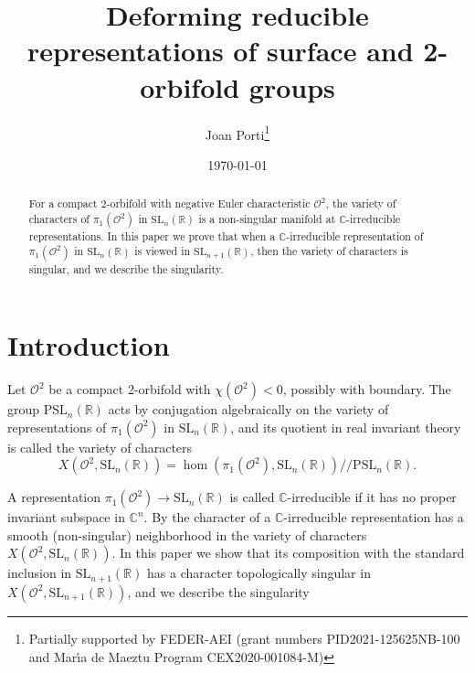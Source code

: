 \documentclass[a4paper,11pt]{article}
\begin{document}
\title{Deforming reducible representations of surface and 2-orbifold groups}

\author{Joan Porti\footnote{Partially supported by 
FEDER-AEI (grant numbers PID2021-125625NB-100 and
Mar\'\i a de Maeztu Program CEX2020-001084-M)
}} 

\date{\today}
\maketitle

\begin{abstract}
For a compact 2-orbifold with negative Euler characteristic $\mathcal O^2$, 
the variety of characters of $\pi_1(\mathcal O^2)$ in $\mathrm{SL}_{n}(\mathbb R)$
is a non-singular manifold at  $\mathbb C$-irreducible representations. In this paper we prove that when 
a $\mathbb C$-irreducible representation of $\pi_1(\mathcal O^2)$ in $\mathrm{SL}_{n}(\mathbb R)$ is viewed
in  $\mathrm{SL}_{n+1}(\mathbb R)$, then the variety of characters is singular, 
and we describe the singularity. 
\end{abstract}



 
\section{Introduction}
\label{Section:introduction}




Let $\mathcal O^2$ be a compact 2-orbifold with $\chi(\mathcal O^2)<0$, 
possibly with boundary.
The group $
\mathrm{PSL}_n(\mathbb R) $ acts by conjugation 
algebraically on the variety of representations
of $\pi_1(\mathcal O^2)$ in $\mathrm{SL}_{n}(\mathbb R)$, and its quotient in 
real invariant theory is called the variety of characters
$$X( \mathcal O^2, \mathrm{SL}_{n}(\mathbb R))
=\hom( \pi_1(\mathcal O^2) , \mathrm{SL}_{n}(\mathbb R) ) /\!/  \mathrm{PSL}_n(\mathbb R). 
$$

A representation $\pi_1(\mathcal O^2)\to \mathrm{SL}_{n}(\mathbb R)$ is called 
$\mathbb C$-irreducible if it has no proper invariant subspace 
 in $\mathbb C^n$. 
By \cite{Goldman}
the character of a $\mathbb C$-irreducible representation 
has a smooth (non-singular) neighborhood in the variety of characters 
$X( \mathcal O^2, \mathrm{SL}_{n}(\mathbb R))
$.
In this paper we show that its composition with the
standard inclusion in $\mathrm{SL}_{n+1}(\mathbb R)$ 
has a character topologically singular in
$
X( \mathcal O^2, \mathrm{SL}_{n+1}(\mathbb R))
$, and we describe the singularity
\end{document}
